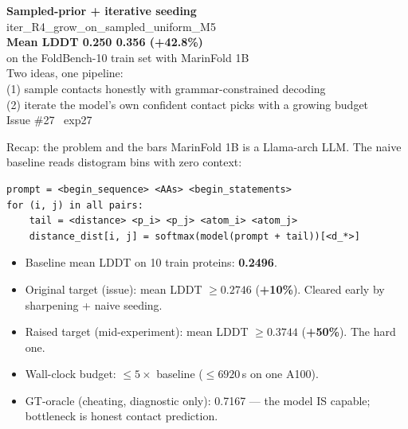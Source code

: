 \documentclass[aspectratio=169,11pt]{beamer}
\begin{document}
\begin{frame}[plain]
  \begin{center}
    \vspace{0.6cm}
    {\Huge\bfseries\color{navy}Sampled-prior + iterative seeding}\\[0.4cm]
    {\Large\color{navy}\ttfamily iter\_R4\_grow\_on\_sampled\_uniform\_M5}\\[0.7cm]
    {\large\color{green}\bfseries Mean LDDT 0.250 \textrightarrow{} 0.356 \quad (+42.8\%)}\\[0.3cm]
    {\large\color{navy}on the FoldBench-10 train set with MarinFold 1B}\\[1.2cm]
    {\small\color{navy}Two ideas, one pipeline:\\[0.3em]
     (1) sample contacts honestly with grammar-constrained decoding\\
     (2) iterate the model's own confident contact picks with a growing budget}\\[0.7cm]
    {\small\color{grey}\ttfamily Issue \#27 \textperiodcentered\ exp27}
  \end{center}
\end{frame}

\begin{frame}[fragile]{Recap: the problem and the bars}
  MarinFold 1B is a Llama-arch LLM. The naive baseline reads
  distogram bins with zero context:
  \begin{lstlisting}[style=code]
prompt = <begin_sequence> <AAs> <begin_statements>
for (i, j) in all pairs:
    tail = <distance> <p_i> <p_j> <atom_i> <atom_j>
    distance_dist[i, j] = softmax(model(prompt + tail))[<d_*>]
  \end{lstlisting}
  \vspace{0.3em}
  \begin{itemize}
    \setlength\itemsep{0.3em}
    \item Baseline mean LDDT on 10 train proteins: \textbf{0.2496}.
    \item Original target (issue): mean LDDT $\geq 0.2746$ (\textbf{+10\%}). Cleared
          early by sharpening + naive seeding.
    \item Raised target (mid-experiment): mean LDDT $\geq 0.3744$
          (\textbf{+50\%}). The hard one.
    \item Wall-clock budget: $\leq 5\times$ baseline ($\leq 6920$\,s on one A100).
    \item GT-oracle (cheating, diagnostic only): 0.7167 — the model
          IS capable; bottleneck is honest contact prediction.
  \end{itemize}
\end{frame}
\end{document}
